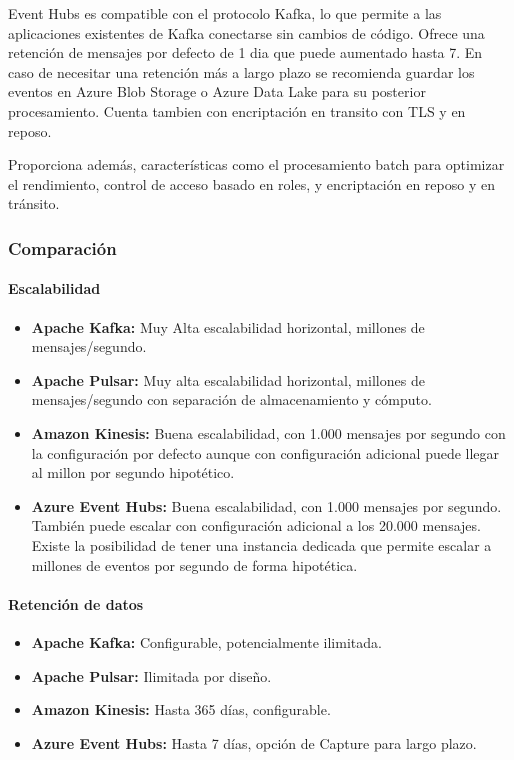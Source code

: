 Event Hubs es compatible con el protocolo Kafka, lo que permite a las aplicaciones existentes de Kafka conectarse sin cambios de código.
Ofrece una retención de mensajes por defecto de 1 dia que puede aumentado hasta 7. En caso de necesitar una retención más a largo plazo
se recomienda guardar los eventos en Azure Blob Storage o Azure Data Lake para su posterior procesamiento. 
Cuenta tambien con encriptación en transito con TLS y en reposo.

Proporciona además, características como el procesamiento batch para optimizar el rendimiento, 
control de acceso basado en roles, y encriptación en reposo y en tránsito. 

\subsubsection{Comparación}

\paragraph{Escalabilidad}
\begin{itemize}
    \item \textbf{Apache Kafka:} Muy Alta escalabilidad horizontal, millones de mensajes/segundo.
    \item \textbf{Apache Pulsar:} Muy alta escalabilidad horizontal, millones de mensajes/segundo con separación de almacenamiento y cómputo.
    \item \textbf{Amazon Kinesis:} Buena escalabilidad, con 1.000 mensajes por segundo con la configuración por defecto aunque con configuración adicional puede llegar al millon por segundo hipotético.
    \item \textbf{Azure Event Hubs:} Buena escalabilidad, con 1.000 mensajes por segundo. También puede escalar con configuración adicional a los 20.000 mensajes. Existe la posibilidad de tener una instancia dedicada que permite escalar a millones de eventos por segundo de forma hipotética.
\end{itemize}

\newpage
\paragraph{Retención de datos}
\begin{itemize}
    \item \textbf{Apache Kafka:} Configurable, potencialmente ilimitada.
    \item \textbf{Apache Pulsar:} Ilimitada por diseño.
    \item \textbf{Amazon Kinesis:} Hasta 365 días, configurable.
    \item \textbf{Azure Event Hubs:} Hasta 7 días, opción de Capture para largo plazo.
\end{itemize}

